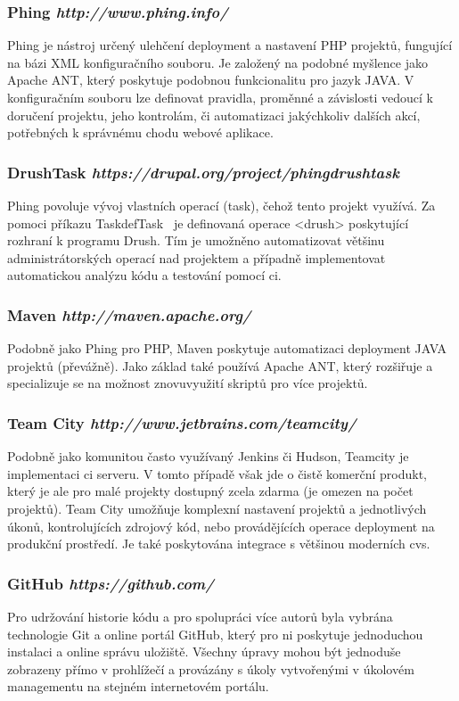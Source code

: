 \subsubsection*{Phing \hfill \emph{http://www.phing.info/}}
\label{subsec:phing}
Phing je nástroj určený ulehčení \gls{deployment} a nastavení PHP projektů, fungující na bázi XML konfiguračního souboru. Je založený na podobné myšlence jako Apache ANT, který poskytuje podobnou funkcionalitu pro jazyk JAVA. V konfiguračním souboru lze definovat pravidla, proměnné a závislosti vedoucí k doručení projektu, jeho kontrolám, či automatizaci jakýchkoliv dalších akcí, potřebných k správnému chodu webové aplikace.

\subsubsection*{DrushTask \hfill \emph{https://drupal.org/project/phingdrushtask}}
Phing povoluje vývoj vlastních operací (task), čehož tento projekt využívá. Za pomoci příkazu TaskdefTask~\cite{website:phing-user-guide} je definovaná operace <drush> poskytující rozhraní k programu Drush. Tím je umožněno automatizovat většinu administrátorských operací nad projektem a případně implementovat automatickou analýzu kódu a testování pomocí \gls{ci}.

\subsubsection*{Maven \hfill \emph{http://maven.apache.org/}}
Podobně jako Phing pro PHP, Maven poskytuje automatizaci \gls{deployment} JAVA projektů (převážně). Jako základ také používá Apache ANT, který rozšiřuje a specializuje se na možnost znovuvyužití skriptů pro více projektů. 

\subsubsection*{Team City \hfill \emph{http://www.jetbrains.com/teamcity/}}
Podobně jako komunitou často využívaný Jenkins či Hudson, Teamcity je implementaci \gls{ci} serveru. V tomto případě však jde o čistě komerční produkt, který je ale pro malé projekty dostupný zcela zdarma (je omezen na počet projektů). Team City umožňuje komplexní nastavení projektů a jednotlivých úkonů, kontrolujících zdrojový kód, nebo provádějících operace \gls{deployment} na produkční prostředí. Je také poskytována integrace s většinou moderních \gls{cvs}.

\subsubsection*{GitHub \hfill \emph{https://github.com/}}
\label{subsec:github}
Pro udržování historie kódu a pro spolupráci více autorů byla vybrána technologie Git a online portál GitHub, který pro ni poskytuje jednoduchou instalaci a online správu uložiště. Všechny úpravy mohou být jednoduše zobrazeny přímo v prohlížečí a provázány s úkoly vytvořenými v úkolovém managementu na stejném internetovém portálu. 

